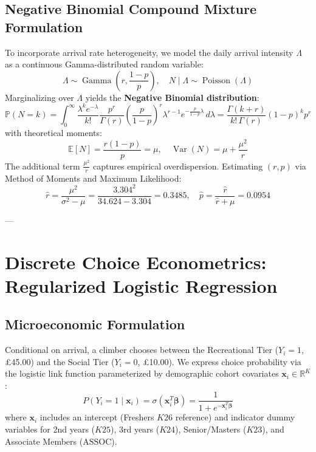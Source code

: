 \documentclass[11pt,a4paper]{article}
\begin{document}
\subsection{Negative Binomial Compound Mixture Formulation}
To incorporate arrival rate heterogeneity, we model the daily arrival intensity $\Lambda$ as a continuous Gamma-distributed random variable:
\begin{equation}
\Lambda \sim \operatorname{Gamma}\left(r, \frac{1-p}{p}\right), \quad N \mid \Lambda \sim \operatorname{Poisson}(\Lambda)
\end{equation}
Marginalizing over $\Lambda$ yields the \textbf{Negative Binomial distribution}:
\begin{equation}
\mathbb{P}(N = k) = \int_0^\infty \frac{\lambda^k e^{-\lambda}}{k!} \frac{p^r}{\Gamma(r)} \left(\frac{p}{1-p}\right)^r \lambda^{r-1} e^{-\frac{p}{1-p}\lambda} \, d\lambda = \frac{\Gamma(k + r)}{k! \, \Gamma(r)} (1 - p)^k p^r
\end{equation}
with theoretical moments:
\begin{equation}
\mathbb{E}[N] = \frac{r(1-p)}{p} = \mu, \quad \operatorname{Var}(N) = \mu + \frac{\mu^2}{r}
\end{equation}
The additional term $\frac{\mu^2}{r}$ captures empirical overdispersion. Estimating $(r, p)$ via Method of Moments and Maximum Likelihood:
\begin{equation}
\hat{r} = \frac{\mu^2}{\sigma^2 - \mu} = \frac{3.304^2}{34.624 - 3.304} = \mathbf{0.3485}, \quad \hat{p} = \frac{\hat{r}}{\hat{r} + \mu} = \mathbf{0.0954}
\end{equation}

---

\section{Discrete Choice Econometrics: Regularized Logistic Regression}

\subsection{Microeconomic Formulation}
Conditional on arrival, a climber chooses between the Recreational Tier ($Y_i = 1$, \pounds 45.00) and the Social Tier ($Y_i = 0$, \pounds 10.00). We express choice probability via the logistic link function parameterized by demographic cohort covariates $\mathbf{x}_i \in \mathbb{R}^K$:
\begin{equation}
P(Y_i = 1 \mid \mathbf{x}_i) = \sigma(\mathbf{x}_i^T \mathbf{\beta}) = \frac{1}{1 + e^{-\mathbf{x}_i^T \mathbf{\beta}}}
\end{equation}
where $\mathbf{x}_i$ includes an intercept (Freshers $K26$ reference) and indicator dummy variables for 2nd years ($K25$), 3rd years ($K24$), Senior/Masters ($K23$), and Associate Members ($\text{ASSOC}$).
\end{document}
